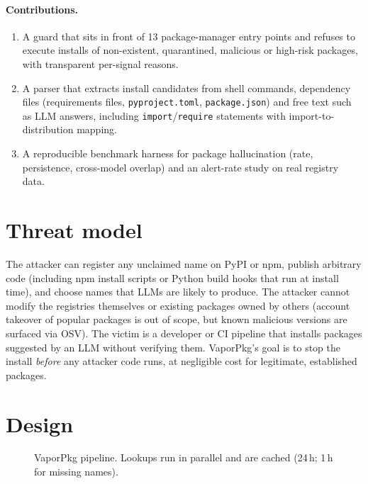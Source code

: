 \documentclass[11pt,a4paper]{article}
\begin{document}
\paragraph{Contributions.}
\begin{enumerate}
  \item A guard that sits in front of 13 package-manager entry points and refuses to execute installs of
        non-existent, quarantined, malicious or high-risk packages, with transparent per-signal reasons.
  \item A parser that extracts install candidates from shell commands, dependency files
        (requirements files, \texttt{pyproject.toml}, \texttt{package.json}) and free text such as
        LLM answers, including \texttt{import}/\texttt{require} statements with import-to-distribution
        mapping.
  \item A reproducible benchmark harness for package hallucination (rate, persistence, cross-model overlap)
        and an alert-rate study on real registry data.
\end{enumerate}

\section{Threat model}
The attacker can register any unclaimed name on PyPI or npm, publish arbitrary code (including npm
install scripts or Python build hooks that run at install time), and choose names that LLMs are likely to
produce. The attacker cannot modify the registries themselves or existing packages owned by others
(account takeover of popular packages is out of scope, but known malicious versions are surfaced via OSV).
The victim is a developer or CI pipeline that installs packages suggested by an LLM without verifying them.
VaporPkg's goal is to stop the install \emph{before} any attacker code runs, at negligible cost for
legitimate, established packages.

\section{Design}
\begin{figure}[h]
\centering
{}
\caption{VaporPkg pipeline. Lookups run in parallel and are cached (24\,h; 1\,h for missing names).}
\end{figure}
\end{document}
